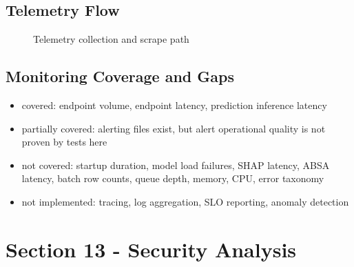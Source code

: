 \subsection{Telemetry Flow}
\begin{figure}[H]
\centering
{}
\caption{Telemetry collection and scrape path}
\end{figure}

\subsection{Monitoring Coverage and Gaps}
\begin{itemize}[leftmargin=1.2em]
  \item covered: endpoint volume, endpoint latency, prediction inference latency
  \item partially covered: alerting files exist, but alert operational quality is not proven by tests here
  \item not covered: startup duration, model load failures, SHAP latency, ABSA latency, batch row counts, queue depth, memory, CPU, error taxonomy
  \item not implemented: tracing, log aggregation, SLO reporting, anomaly detection
\end{itemize}

\section{Section 13 - Security Analysis}
